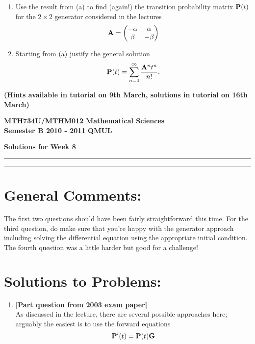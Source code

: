 \documentclass[11pt,a4paper]{article}
\begin{document}
\begin{enumerate}
\begin{enumerate}
      \item Use the result from (a) to find (again!) the transition probability matrix $\vb{P}(t)$ for the $2 \times 2$ generator considered in the lectures
      $$
      \vb{A} =
      \begin{pmatrix}
        -\alpha & \alpha\\
        \beta & -\beta
      \end{pmatrix}
      $$
      \item Starting from (a) justify the general solution
      $$
      \vb{P}(t) = \sum_{n = 0}^\infty \frac{\vb{A}^nt^n}{n!}.
      $$
    \end{enumerate}
    \textbf{(Hints available in tutorial on 9th March, solutions in tutorial on 16th March)}
  \end{enumerate}

  \newpage
  \textbf{MTH734U/MTHM012} \hfill \textbf{Mathematical Sciences}\\
  \textbf{Semester B 2010 - 2011} \hfill \textbf{QMUL}
  \begin{center}
    \textbf{\huge Solutions for Week 8}
  \end{center}
  \hrule \vspace{2mm} \hrule

  \section*{General Comments:}
  The first two questions should have been fairly straightforward this time. For the third question, do make sure that you're happy with the generator approach including solving the differential equation using the appropriate initial condition. The fourth question was a little harder but good for a challenge!

  \section*{Solutions to Problems:}
  \begin{enumerate}
    \item \textbf{[Part question from 2003 exam paper]}\\
    As discussed in the lecture, there are several possible approaches here; arguably the easiest is to use the forward equations
    $$
    \vb{P}^\prime(t) = \vb{P}(t)\vb{G}
    $$
  \end{enumerate}
\end{document}
